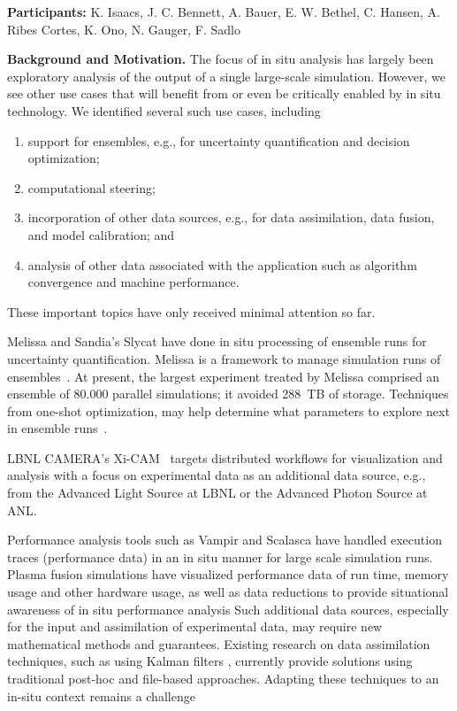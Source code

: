 \license

\textbf{\sffamily Participants:} K. Isaacs, J. C. Bennett, A. Bauer, E. W. Bethel, C. Hansen, A. Ribes Cortes, K. Ono, N. Gauger, F. Sadlo

\medskip\noindent
\textbf{\sffamily Background and Motivation.}
The focus of in situ analysis has largely been exploratory analysis of the output of a single large-scale simulation. 
However, we see other use cases that will benefit from or even be critically enabled by in situ technology. 
We identified several such use cases, including 
\begin{enumerate}
    \item support for ensembles, e.g., for uncertainty quantification and decision optimization;
    \item computational steering;
    \item  incorporation of other data sources, e.g., for data assimilation, data fusion, and model calibration; and
    \item analysis of other data associated with the application such as algorithm convergence and machine performance. 
\end{enumerate}
These important topics have only received minimal attention so far. 

Melissa and Sandia’s Slycat have done in situ processing of ensemble runs for uncertainty quantification.
Melissa is a framework to manage simulation runs of ensembles~\cite{TRF17}. 
At present, the largest experiment treated by Melissa comprised an ensemble of 80.000 parallel simulations; it avoided 288~TB of storage.
Techniques from one-shot optimization, may help determine what parameters to explore next in ensemble runs~\cite{GGW16}.

LBNL CAMERA's Xi-CAM~\cite{XiCAM} targets distributed workflows for visualization and analysis with a focus on experimental data as an additional data source, e.g., from the Advanced Light Source at LBNL or the Advanced Photon Source at ANL. 

Performance analysis tools such as Vampir and Scalasca have handled execution traces (performance data) in an in situ manner for large scale simulation runs. Plasma fusion simulations have visualized performance data of run time, memory usage and other hardware usage, as well as data reductions to provide situational awareness of in situ performance analysis\cite{WOIV_2018}
Such additional data sources, especially for the input and assimilation of experimental data, may require new mathematical methods and guarantees.
Existing research on data assimilation techniques, such as using Kalman filters \cite{EVE09}, currently provide solutions using traditional post-hoc and file-based approaches. Adapting these techniques to an in-situ context remains a challenge

